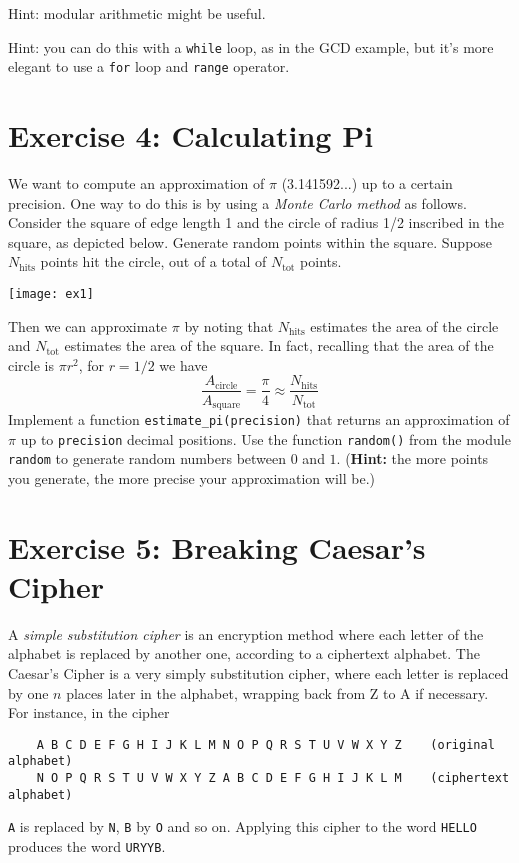 \documentclass{article}
\begin{document}
\vspace{0.1in}\noindent Hint: modular arithmetic might be useful.

\vspace{0.1in}\noindent Hint: you can do this with a \texttt{while} loop, as in the GCD example, but it's
more elegant to use a \texttt{for} loop and \texttt{range} operator.

\section*{Exercise 4: Calculating Pi}

We want to compute an approximation of $\pi$ (3.141592...) up to a
 certain precision. One way to do this is by using a \emph{Monte Carlo
 method} as follows. Consider the square of edge length 1 and the
 circle of radius 1/2 inscribed in the square, as depicted
 below. Generate random points within the square. Suppose
 $N_{\text{hits}}$ points hit the circle, out of a total of
 $N_{\text{tot}}$ points.


\begin{center}
\texttt{[image: ex1]}
\end{center}

Then we can approximate $\pi$ by noting that $N_{\text{hits}}$
 estimates the area of the circle and $N_{\text{tot}}$ estimates the
 area of the square. In fact, recalling that the area of the circle is
 $\pi r^2$, for $r=1/2$ we have
\[
	\frac{A_{\text{circle}}}{A_{\text{square}}} = \frac{\pi}{4} \approx \frac{N_{\text{hits}}}{N_{\text{tot}}}
\]
%
Implement a function \texttt{estimate\_pi(precision)} that returns an
 approximation of $\pi$ up to \texttt{precision} decimal
 positions. Use the function \texttt{random()} from the module
 \texttt{random} to generate random numbers between $0$ and
 $1$. (\textbf{Hint:} the more points you generate, the more precise
 your approximation will be.)


\section*{Exercise 5: Breaking Caesar's Cipher}

A \emph{simple substitution cipher} is an encryption method where each letter of the alphabet is replaced by another one, according to a ciphertext alphabet. The Caesar's Cipher is a very simply substitution cipher, where each letter is replaced by one $n$ places later in the alphabet, wrapping back from Z to A if necessary.
For instance, in the cipher
\begin{verbatim}
    A B C D E F G H I J K L M N O P Q R S T U V W X Y Z    (original alphabet)
    N O P Q R S T U V W X Y Z A B C D E F G H I J K L M    (ciphertext alphabet)
\end{verbatim}
\texttt{A} is replaced by \texttt{N}, \texttt{B} by \texttt{O} and so on. Applying this cipher to the word \texttt{HELLO} produces the word \texttt{URYYB}. 
\end{document}
